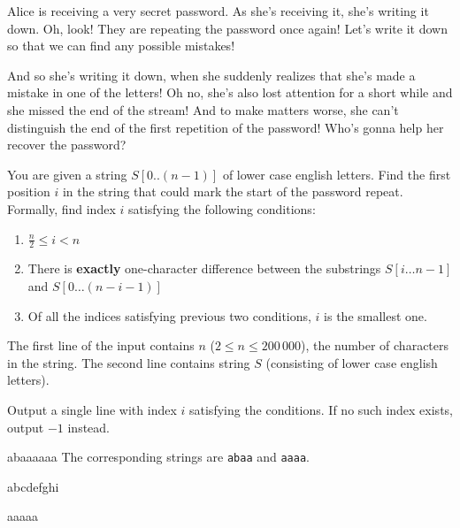 





Alice is receiving a very secret password. As she's receiving it, she's writing
it down. Oh, look! They are repeating the password once again! Let's write it down
so that we can find any possible mistakes!

And so she's writing it down, when she suddenly realizes that she's made a mistake
in one of the letters! Oh no, she's also lost attention for a short while and she
missed the end of the stream! And to make matters worse, she can't distinguish the
end of the first repetition of the password! Who's gonna help her recover the password?


You are given a string $S[0..(n-1)]$ of lower case english letters. Find the first position $i$ in the
string that could mark the start of the password repeat. Formally, find index $i$ satisfying the following conditions:

\begin{enumerate}
    \item $\frac{n}{2} \leq i < n$
    \item There is \textbf{exactly} one-character difference between the
    substrings $S[i\ldots n-1]$ and $S[0\ldots (n - i - 1)]$
    \item Of all the indices satisfying previous two conditions, $i$ is the
    smallest one.
\end{enumerate}


The first line of the input contains $n$ ($2 \leq n \leq 200\,000$), the number of characters in the string.
The second line contains string $S$ (consisting of lower case english letters).


Output a single line with index $i$ satisfying the conditions. If no such index
exists, output $-1$ instead.



abaaaaaa
\sampleCOMMENT
The corresponding strings are \texttt{abaa} and \texttt{aaaa}.
\sampleEND


\bigskip


abcdefghi
\sampleEND

\bigskip

aaaaa
\sampleEND


